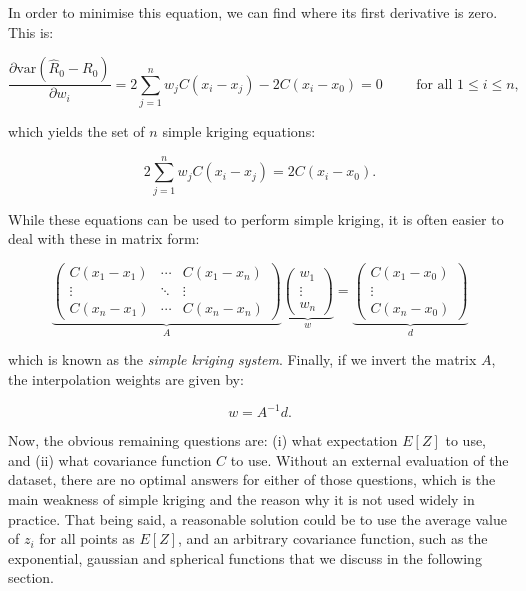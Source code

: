 In order to minimise this equation, we can find where its first derivative is zero.
This is:

\begin{equation}
\frac{\partial \mathrm{var}\left(\hat{R}_0 - R_0\right)}{\partial w_i} = 2 \sum_{j=1}^n w_j C(x_i-x_j) - 2C(x_i-x_0) = 0 \hspace{1cm} \text{for all } 1 \leq i \leq n, \nonumber
\end{equation}

which yields the set of \(n\) simple kriging equations:

\begin{equation}
2 \sum_{j=1}^n w_j C(x_i-x_j) = 2C(x_i-x_0).
\end{equation}

While these equations can be used to perform simple kriging, it is often easier to deal with these in matrix form:

\begin{equation}
%
\underbrace{\left( \begin{array}{ccc}
C(x_1-x_1) & \cdots & C(x_1-x_n) \\
\vdots & \ddots & \vdots \\
C(x_n-x_1) & \cdots & C(x_n-x_n) \end{array} \right)}_{A}
%
\underbrace{\left(\begin{array}{c}
w_1 \\
\vdots \\
w_n \end{array} \right)}_{w} = 
%
\underbrace{\left(\begin{array}{c}
C(x_1-x_0) \\
\vdots \\
C(x_n-x_0) \end{array} \right)}_{d}
\end{equation}

which is known as the \emph{simple kriging system}.
Finally, if we invert the matrix \(A\), the interpolation weights are given by:

\begin{equation}
w = A^{-1}d.
\end{equation}

Now, the obvious remaining questions are: (i) what expectation \(E[Z]\) to use, and (ii) what covariance function \(C\) to use.
Without an external evaluation of the dataset, there are no optimal answers for either of those questions, which is the main weakness of simple kriging and the reason why it is not used widely in practice.
That being said, a reasonable solution could be to use the average value of \(z_i\) for all points as \(E[Z]\), and an arbitrary covariance function, such as the exponential, gaussian and spherical functions that we discuss in the following section.


